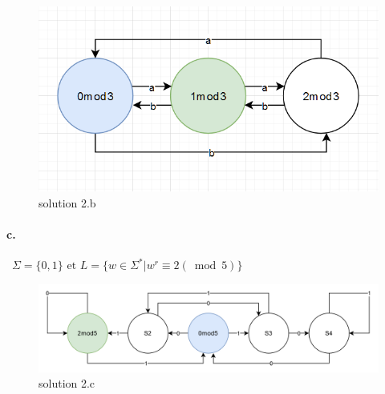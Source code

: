 \documentclass{article}
\begin{document}
\begin{figure}[h]
    \centering
    \includegraphics[scale = 0.5]{2b.png}
    \caption{solution 2.b}
    \label{fig.2b}
\end{figure}

\paragraph{c.}~$\Sigma = \{0,1\} \text{ et } L = \{w \in \Sigma^{*} | w^r \equiv 2(\bmod 5)\}$ \\ 
\begin{figure}[h]
    \centering
    \includegraphics[scale = 0.3]{2c.png}
    \caption{solution 2.c}
    \label{fig.2c}
\end{figure}
\end{document}
